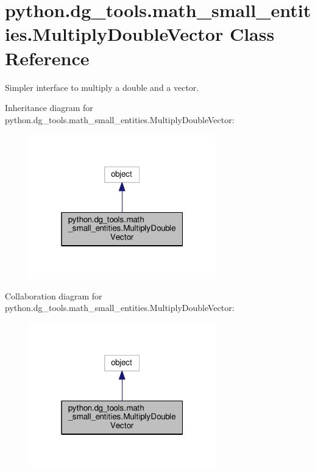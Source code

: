 \hypertarget{classpython_1_1dg__tools_1_1math__small__entities_1_1MultiplyDoubleVector}{}\section{python.\+dg\+\_\+tools.\+math\+\_\+small\+\_\+entities.\+Multiply\+Double\+Vector Class Reference}
\label{classpython_1_1dg__tools_1_1math__small__entities_1_1MultiplyDoubleVector}


Simpler interface to multiply a double and a vector.  




Inheritance diagram for python.\+dg\+\_\+tools.\+math\+\_\+small\+\_\+entities.\+Multiply\+Double\+Vector\+:
\nopagebreak
\begin{figure}[H]
\begin{center}
\leavevmode
\includegraphics[width=229pt]{classpython_1_1dg__tools_1_1math__small__entities_1_1MultiplyDoubleVector__inherit__graph}
\end{center}
\end{figure}


Collaboration diagram for python.\+dg\+\_\+tools.\+math\+\_\+small\+\_\+entities.\+Multiply\+Double\+Vector\+:
\nopagebreak
\begin{figure}[H]
\begin{center}
\leavevmode
\includegraphics[width=229pt]{classpython_1_1dg__tools_1_1math__small__entities_1_1MultiplyDoubleVector__coll__graph}
\end{center}
\end{figure}
